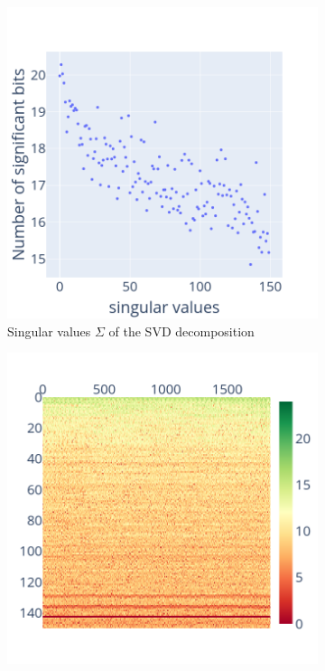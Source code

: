 \documentclass[11pt]{article}
\begin{document}
\begin{figure}
\begin{subfigure}{0.3\linewidth}
    \includegraphics[width=\linewidth]{figure/face_recognition/randomized_svd_ret_S_sig.png}
    \caption{Singular values $\Sigma$ of the SVD decomposition}
    \label{fig:randomized_svd_S}
    \end{subfigure}
    \begin{subfigure}{0.3\linewidth}
    \includegraphics[width=\linewidth]{figure/face_recognition/randomized_svd_ret_V_sig_zoom.png}

\end{subfigure}
\end{figure}
\end{document}
